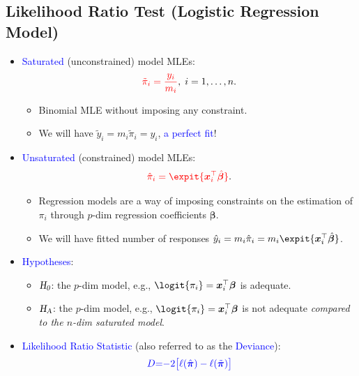 \documentclass[oneside]{book}\usepackage[]{graphicx}\usepackage[svgnames]{xcolor}
\newcommand{\HN}{\textsl{H}_{\textsl{0}}}%
\newcommand{\HA}{\textsl{H}_{\textsl{A}}}%
\providecommand{\Vector}[1]{\bm{#1}}%
\begin{document}
\subsection*{Likelihood Ratio Test (Logistic Regression Model)}
\begin{itemize}
      \item \textcolor{Blue}{Saturated} (unconstrained) model MLEs:
            \[ \textcolor{Red}{\tilde{\pi}_i=\frac{y_i}{m_i}},\; i=1,\ldots,n. \]
            \begin{itemize}
                  \item Binomial MLE without imposing any constraint.
                  \item We will have $ \tilde{y}_i=m_i\tilde{\pi}_i=y_i $, \textcolor{Blue}{a perfect fit}!
            \end{itemize}
      \item \textcolor{Blue}{Unsaturated} (constrained) model MLEs:
            \[ \textcolor{Red}{\hat{\pi}_i=\expit{\Vector{x}_i^\top \hat{\Vector{\beta}}}}. \]
            \begin{itemize}
                  \item Regression models are a way of imposing constraints on the estimation of $ \pi_i $ through $ p $-dim regression coefficients $ \Vector{\beta} $.
                  \item We will have fitted number of responses $ \hat{y}_i=m_i\hat{\pi}_i=m_i\expit{\Vector{x}_i^\top \hat{\Vector{\beta}}} $.
            \end{itemize}
      \item \textcolor{Blue}{Hypotheses}:
            \begin{itemize}
                  \item $ \HN $: the $ p $-dim model, e.g., $ \logit{\pi_i}=\Vector{x}_i^\top \Vector{\beta} $ is adequate.
                  \item $ \HA $: the $ p $-dim model, e.g., $ \logit{\pi_i}=\Vector{x}_i^\top \Vector{\beta} $ is not adequate \emph{compared
                              to the $ n $-dim saturated model}.
            \end{itemize}
      \item \textcolor{Blue}{Likelihood Ratio Statistic} (also referred to as the \textcolor{Blue}{Deviance}):
            \begin{align*}
                  \textcolor{Blue}{D}
                   & \textcolor{Blue}{=}\textcolor{Blue}{-2\bigl[\ell(\hat{\Vector{\pi}})-\ell(\tilde{\Vector{\pi}})\bigr]}                     \\

\end{align*}
\end{itemize}
\end{document}
